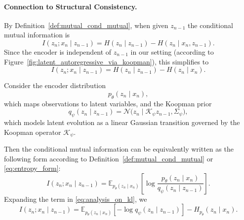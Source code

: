 \documentclass{article} %
\newcommand{\zs}[1]{\textcolor{blue}{[ZS: #1]}}
\begin{document}

\paragraph{Connection to Structural Consistency.} 


By Definition~\ref{def:mutual_cond_mutual}, when given $z_{n-1}$ the conditional mutual information is 
\[
I(z_n; x_n \mid z_{n-1}) 
= H(z_{n}\mid z_{n-1}) - H(z_n\mid x_{n}, z_{n-1}).
\]
Since the encoder is independent of $z_{n-1}$ in our setting (according to Figure~\ref{fig:latent_autoregressive_via_koopman}), this simplifies to 
\begin{equation} \label{eq:entropy_form}
    I(z_n; x_n \mid z_{n-1}) 
= H(z_{n}\mid z_{n-1}) - H(z_n\mid x_{n}).
\end{equation}

Consider the encoder distribution 
\[
p_\theta(z_n \mid x_n),
\] 
which maps observations to latent variables, and the Koopman prior
\[
q_\psi(z_n \mid z_{n-1}) = \mathcal{N}\!\big(z_n \mid \mathcal{K}_\psi z_{n-1}, \Sigma_\psi\big),
\] 
which models latent evolution as a linear Gaussian transition governed by the Koopman operator $\mathcal{K}_\psi$. 

Then the conditional mutual information can be equivalently written as the following form according to Definition~\ref{def:mutual_cond_mutual} or \eqref{eq:entropy_form}: 
\begin{equation} \label{eq:analysis_on_kl}
I(z_n; x_n \mid z_{n-1}) 
= \mathbb{E}_{p_\theta(z_n \mid x_n)}
\left[
    \log \frac{p_\theta(z_n \mid x_n)}{q_\psi(z_n \mid z_{n-1})}
\right].
\end{equation}
Expanding the term in \eqref{eq:analysis_on_kl}, we 
\[
I(z_n; x_n \mid z_{n-1}) 
= \mathbb{E}_{p_\theta(z_n \mid x_n)}[-\log q_\psi(z_n \mid z_{n-1})]
- H_{p_\theta}(z_n \mid x_n).
\]
\end{document}
